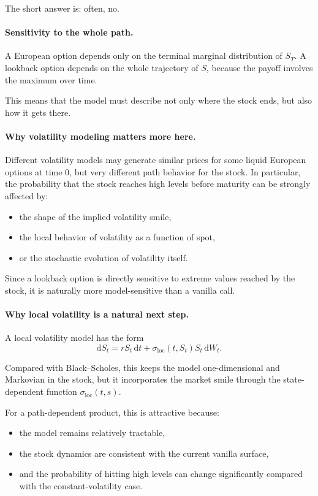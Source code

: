 \documentclass[11pt]{article}
\theoremstyle{plain}
\theoremstyle{definition}
\theoremstyle{remark}
\begin{document}
The short answer is: often, no.

\paragraph{Sensitivity to the whole path.}
A European option depends only on the terminal marginal distribution of
\(S_T\).
A lookback option depends on the whole trajectory of \(S\), because the
payoff involves the maximum over time.

This means that the model must describe not only where the stock ends,
but also how it gets there.

\paragraph{Why volatility modeling matters more here.}
Different volatility models may generate similar prices for some liquid
European options at time \(0\), but very different path behavior for the
stock.
In particular, the probability that the stock reaches high levels before
maturity can be strongly affected by:
\begin{itemize}[leftmargin=1.4em]
    \item the shape of the implied volatility smile,
    \item the local behavior of volatility as a function of spot,
    \item or the stochastic evolution of volatility itself.
\end{itemize}

Since a lookback option is directly sensitive to extreme values reached
by the stock, it is naturally more model-sensitive than a vanilla call.

\paragraph{Why local volatility is a natural next step.}
A local volatility model has the form
\[
\mathrm{d}S_t
=
rS_t\,\mathrm{d}t
+
\sigma_{\mathrm{loc}}(t,S_t)S_t\,\mathrm{d}W_t.
\]

Compared with Black--Scholes, this keeps the model one-dimensional and
Markovian in the stock, but it incorporates the market smile through the
state-dependent function \(\sigma_{\mathrm{loc}}(t,s)\).

For a path-dependent product, this is attractive because:
\begin{itemize}[leftmargin=1.4em]
    \item the model remains relatively tractable,
    \item the stock dynamics are consistent with the current vanilla
    surface,
    \item and the probability of hitting high levels can change
    significantly compared with the constant-volatility case.
\end{itemize}
\end{document}
